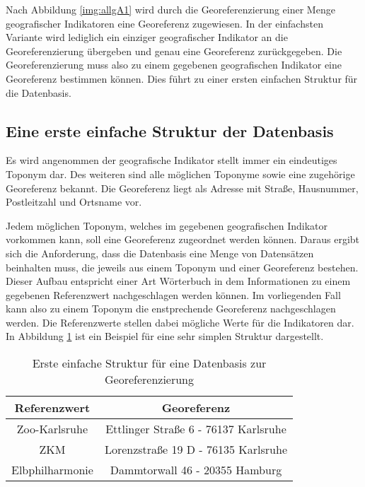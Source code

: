 		Nach Abbildung \ref{img:allgA1} wird durch die Georeferenzierung einer Menge geografischer Indikatoren eine Georeferenz zugewiesen.
		In der einfachsten Variante wird lediglich ein einziger geografischer Indikator an die Georeferenzierung übergeben und genau eine Georeferenz zurückgegeben.
		Die Georeferenzierung muss also zu einem gegebenen geografischen Indikator eine Georeferenz bestimmen können.
		Dies führt zu einer ersten einfachen Struktur für die Datenbasis.	

		\subsection*{Eine erste einfache Struktur der Datenbasis} 

			Es wird angenommen der geografische Indikator stellt immer ein eindeutiges Toponym dar.
			Des weiteren sind alle möglichen Toponyme sowie eine zugehörige Georeferenz bekannt. 
			Die Georeferenz liegt als Adresse mit Straße, Hausnummer, Postleitzahl und Ortsname vor.

			Jedem möglichen Toponym, welches im gegebenen geografischen Indikator vorkommen kann, soll eine Georeferenz zugeordnet werden können. 
			Daraus ergibt sich die Anforderung, dass die Datenbasis eine Menge von Datensätzen beinhalten muss, die jeweils aus einem Toponym und einer Georeferenz bestehen.
			Dieser Aufbau entspricht einer Art Wörterbuch in dem Informationen zu einem gegebenen Referenzwert nachgeschlagen werden können.
			Im vorliegenden Fall kann also zu einem Toponym die enstprechende Georeferenz nachgeschlagen werden.
			Die Referenzwerte stellen dabei mögliche Werte für die Indikatoren dar. 
			In Abbildung \ref{tab:simpleStruktur} ist ein Beispiel für eine sehr simplen Struktur dargestellt.

			\begin{table}[htpb]
					\caption{Erste einfache Struktur für eine Datenbasis zur Georeferenzierung} 
					\centering
					\begin{tabular}{|c|c|}
						\hline
						Referenzwert & Georeferenz \\
						\hline\hline
						Zoo-Karlsruhe & Ettlinger Straße 6 - 76137 Karlsruhe \\
						\hline
						ZKM & Lorenzstraße 19 D - 76135 Karlsruhe \\
						\hline
						Elbphilharmonie & Dammtorwall 46 - 20355 Hamburg \\
						\hline
					\end{tabular}
					\label{tab:simpleStruktur} 
			\end{table} 

